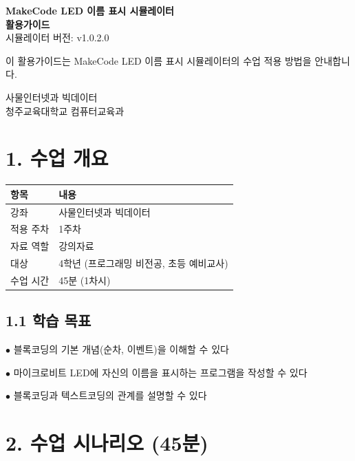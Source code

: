\documentclass[11pt,a4paper]{article}
\begin{document}
\begin{titlepage}
\centering
\vspace*{3cm}
{\Huge\bfseries\color{primary} MakeCode LED 이름 표시 시뮬레이터}\\[0.5cm]
{\Huge\bfseries\color{primary} 활용가이드}
\\[1.5cm]
{\Large 시뮬레이터 버전: v1.0.2.0}
\\[2cm]
\begin{tcolorbox}[summarybox]
\centering
{\large 이 활용가이드는 MakeCode LED 이름 표시 시뮬레이터의 수업 적용 방법을 안내합니다.}
\end{tcolorbox}
\vfill
{\large 사물인터넷과 빅데이터}\\[0.3cm]
{\large 청주교육대학교 컴퓨터교육과}
\vspace{1cm}
\end{titlepage}

\section*{1. 수업 개요}

\begin{center}
\renewcommand{\arraystretch}{1.4}
\begin{tabular}{|p{2.8cm}|p{12.2cm}|}
\hline
\rowcolor{tableheader}
\textbf{항목} & \textbf{내용} \\
\hline
강좌 & 사물인터넷과 빅데이터 \\
\hline
적용 주차 & 1주차 \\
\hline
자료 역할 & 강의자료 \\
\hline
대상 & 4학년 (프로그래밍 비전공, 초등 예비교사) \\
\hline
수업 시간 & 45분 (1차시) \\
\hline
\end{tabular}
\end{center}

\subsection*{1.1 학습 목표}

$\bullet$ 블록코딩의 기본 개념(순차, 이벤트)을 이해할 수 있다

$\bullet$ 마이크로비트 LED에 자신의 이름을 표시하는 프로그램을 작성할 수 있다

$\bullet$ 블록코딩과 텍스트코딩의 관계를 설명할 수 있다



\section*{2. 수업 시나리오 (45분)}
\end{document}
